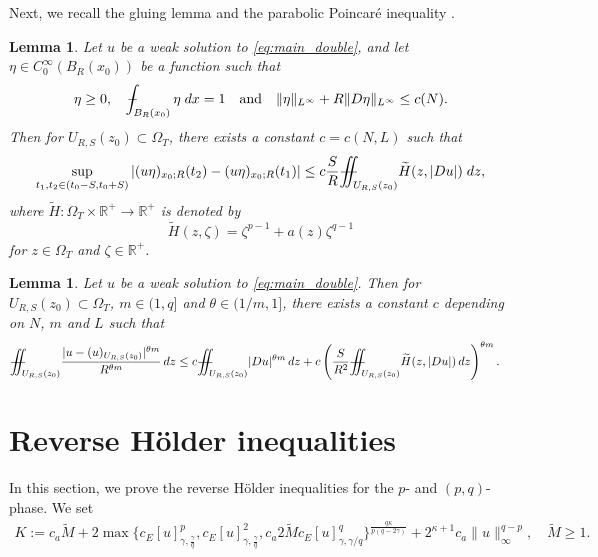 \documentclass[notitlepage,11pt,reqno]{amsart}
\newtheorem{lemma}[theorem]{Lemma}
\theoremstyle{definition}
\numberwithin{equation}{section}
\newcommand{\RR}{\mathds{R}}
\newcommand{ \mr }{ \RR }
\newcommand{\iintss}{{\int\hspace{-0.28cm}\int}}
\newcommand{ \miints }{{\iintss\hspace{-0.56cm} -\hspace{-0.15cm}-}}
\newcommand{\miint}[1]{{\miints_{\hspace{-0.13cm}#1}}}
\def\Xint#1{\mathchoice
	{\XXint\displaystyle\textstyle{#1}}%
	{\XXint\textstyle\scriptstyle{#1}}%
	{\XXint\scriptstyle\scriptscriptstyle{#1}}%
	{\XXint\scriptscriptstyle\scriptscriptstyle{#1}}%
	\!\int}
\def\XXint#1#2#3{{\setbox0=\hbox{$#1{#2#3}{\int}$}
		\vcenter{\hbox{$#2#3$}}\kern-.50\wd0}}
\def\Xint#1{\mathchoice
	{\XXint\displaystyle\textstyle{#1}}%
	{\XXint\textstyle\scriptstyle{#1}}%
	{\XXint\scriptstyle\scriptscriptstyle{#1}}%
	{\XXint\scriptscriptstyle\scriptscriptstyle{#1}}%
	\!\int}
\def\XXint#1#2#3{{\setbox0=\hbox{$#1{#2#3}{\int}$}
		\vcenter{\hbox{$#2#3$}}\kern-.50\wd0}}
\def\dashint{\Xint-}
\begin{document}
Next, we recall the gluing lemma \cite[Lemma 2.4]{2023_Gradient_Higher_Integrability_for_Degenerate_Parabolic_Double-Phase_Systems} and the parabolic  Poincar\'{e} inequality \cite[~2.5]{2023_Gradient_Higher_Integrability_for_Degenerate_Parabolic_Double-Phase_Systems}.
\begin{lemma}    \label{lem: gluing lemma}
Let $u$ be a weak solution to \eqref{eq:main_double}, and let $\eta\in C_0^\infty(B_R(x_0))$ be a function such that
\begin{equation*}    \label{eq: definition of eta in Lemma 3.2}
\eta\geq 0,\quad \dashint_{B_R(x_0)} \eta \; dx =1 \quad \text{and} \quad \|\eta\|_{L^\infty}+R\|D\eta\|_{L^\infty} \leq c(N).
\end{equation*}
Then for $U_{R,S}(z_0)\subset \Omega_T$, there exists a constant $c=c(N, L)$ such that 
\begin{align*}
\sup_{t_1,t_2\in(t_0-S,t_0+S)}|(u\eta)_{x_0;R}(t_2)-(u\eta)_{x_0;R}(t_1)|
 \leq c\frac{S}{R}\miint{U_{R,S}(z_0)}\widetilde{H}(z,|Du|)\; dz,
\end{align*}
 where $\widetilde{H}:\Omega_T\times \mr^+ \rightarrow \mr^+$ is denoted by $$\widetilde{H}(z,\zeta)=\zeta^{p-1}+a(z)\zeta^{q-1}$$ for $z \in \Omega_T$ and $\zeta\in\mr^+$.
\end{lemma}
\begin{lemma}\label{lem : parabolic poincare inequality in Section 3}
    Let $u$ be a weak solution to \eqref{eq:main_double}. Then for $U_{R,S}(z_0)\subset \Omega_T$, $m\in(1,q]$ and $\theta\in(1/m,1]$, there exists a constant $c$ depending on $N$, $m$ and $L$ such that 
    \begin{align}\label{eq : parabolic poincare inequality in Section 3_1}
        \miint{U_{R,S}(z_0)} &\frac{|u-(u)_{U_{R,S}(z_0)}|^{\theta m}}{R^{\theta m}}\, dz \leq c\miint{U_{R,S}(z_0)} |Du|^{\theta m} \,dz +c\left(\frac{S}{R^2}\miint{U_{R,S}(z_0)} \widetilde{H}(z,|Du|)\, dz \right)^{\theta m}.
    \end{align}
\end{lemma}
\section{Reverse H\"{o}lder inequalities}
In this section, we prove the reverse H\"{o}lder inequalities for the $p$- and $(p, q)$-phase. We set
\begin{align}\label{defn of K}
K:=c_a\widetilde M+2\max\{c_E[u]^p_{\gamma,\frac{\gamma}{q}},c_E[u]^2_{\gamma,\frac{\gamma}{q}} ,c_a 2\widetilde Mc_E[u]^q_{\gamma, \gamma/q}\}^{\frac{q\kappa}{p(q-2\gamma)}}+2^{\kappa+1}c_a\|u\|^{q-p}_{\infty}, \quad \widetilde M\geq 1.
\end{align}
\end{document}
